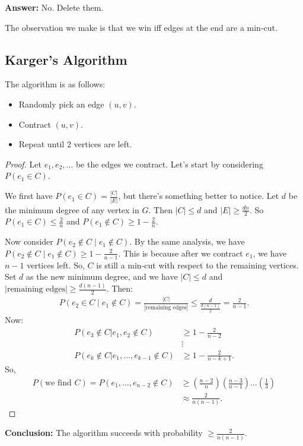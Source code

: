 \documentclass{report}
\begin{document}
\noindent \textbf{Answer:} No. Delete them.

\noindent The observation we make is that we win iff edges at the end are a min-cut.

\subsection{Karger's Algorithm}
\noindent The algorithm is as follows:
\begin{itemize}
    \item Randomly pick an edge $(u, v)$.
    \item Contract $(u, v)$.
    \item Repeat until 2 vertices are left.
\end{itemize}
\begin{proof}
    Let $e_1, e_2, \ldots$ be the edges we contract. Let's start by considering $P(e_1 \in C)$.

    We first have $P(e_1 \in C) = \frac{|C|}{|E|}$, but there's something better to notice. Let $d$ be the minimum degree of any vertex in $G$. Then $|C| \leq d$ and $|E| \geq \frac{dn}{2}$. So $P(e_1 \in C) \leq \frac{2}{n}$ and $P(e_1 \notin C) \geq 1 - \frac{2}{n}$.

    Now consider $P(e_2 \notin C \mid e_1 \notin C)$. By the same analysis, we have $P(e_2 \notin C \mid e_1 \notin C) \geq 1- \frac{2}{n-1}$. This is because after we contract $e_1$, we have $n-1$ vertices left. So, $C$ is still a min-cut with respect to the remaining vertices. Set $d$ as the new minimum degree, and we have $|C| \leq d$ and $|\text{remaining edges}| \geq \frac{d(n-1)}{2}$. Then:
    \begin{align*}
        P(e_2 \in C \mid e_1 \notin C) = \frac{|C|}{|\text{remaining edges}|} \leq \frac{d}{\frac{d(n-1)}{2}} = \frac{2}{n-1}.
    \end{align*}
    Now:
    \begin{align*}
        P(e_3 \notin C | e_1, e_2 \notin C) &\geq 1 - \frac{2}{n-2} \\
        &\vdots \\
        P(e_k \notin C | e_1, \ldots, e_{k-1} \notin C) &\geq 1 - \frac{2}{n-k+1}.
    \end{align*}
    So,
    \begin{align*}
        P(\text{we find } C) = P(e_1, \ldots, e_{n-2} \notin C) &\geq \left(\frac{n-2}{n}\right) \left(\frac{n-3}{n-1}\right) \ldots \left(\frac{1}{3}\right) \\
        &\approx \frac{2}{n(n-1)}.
    \end{align*}
\end{proof}
\textbf{Conclusion:} The algorithm succeeds with probability $\geq  \frac{2}{n(n-1)}$.
\end{document}
